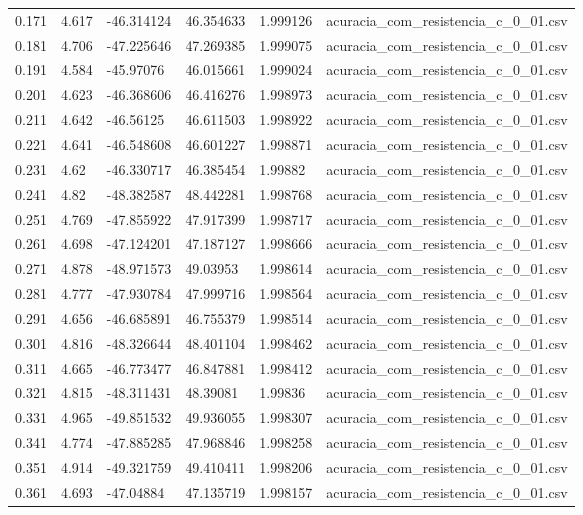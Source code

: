 \begin{table}
\begin{tabular}{llllll}
0.171 & 4.617 & -46.314124 & 46.354633 & 1.999126 & acuracia\_com\_resistencia\_c\_0\_01.csv \\
0.181 & 4.706 & -47.225646 & 47.269385 & 1.999075 & acuracia\_com\_resistencia\_c\_0\_01.csv \\
0.191 & 4.584 & -45.97076 & 46.015661 & 1.999024 & acuracia\_com\_resistencia\_c\_0\_01.csv \\
0.201 & 4.623 & -46.368606 & 46.416276 & 1.998973 & acuracia\_com\_resistencia\_c\_0\_01.csv \\
0.211 & 4.642 & -46.56125 & 46.611503 & 1.998922 & acuracia\_com\_resistencia\_c\_0\_01.csv \\
0.221 & 4.641 & -46.548608 & 46.601227 & 1.998871 & acuracia\_com\_resistencia\_c\_0\_01.csv \\
0.231 & 4.62 & -46.330717 & 46.385454 & 1.99882 & acuracia\_com\_resistencia\_c\_0\_01.csv \\
0.241 & 4.82 & -48.382587 & 48.442281 & 1.998768 & acuracia\_com\_resistencia\_c\_0\_01.csv \\
0.251 & 4.769 & -47.855922 & 47.917399 & 1.998717 & acuracia\_com\_resistencia\_c\_0\_01.csv \\
0.261 & 4.698 & -47.124201 & 47.187127 & 1.998666 & acuracia\_com\_resistencia\_c\_0\_01.csv \\
0.271 & 4.878 & -48.971573 & 49.03953 & 1.998614 & acuracia\_com\_resistencia\_c\_0\_01.csv \\
0.281 & 4.777 & -47.930784 & 47.999716 & 1.998564 & acuracia\_com\_resistencia\_c\_0\_01.csv \\
0.291 & 4.656 & -46.685891 & 46.755379 & 1.998514 & acuracia\_com\_resistencia\_c\_0\_01.csv \\
0.301 & 4.816 & -48.326644 & 48.401104 & 1.998462 & acuracia\_com\_resistencia\_c\_0\_01.csv \\
0.311 & 4.665 & -46.773477 & 46.847881 & 1.998412 & acuracia\_com\_resistencia\_c\_0\_01.csv \\
0.321 & 4.815 & -48.311431 & 48.39081 & 1.99836 & acuracia\_com\_resistencia\_c\_0\_01.csv \\
0.331 & 4.965 & -49.851532 & 49.936055 & 1.998307 & acuracia\_com\_resistencia\_c\_0\_01.csv \\
0.341 & 4.774 & -47.885285 & 47.968846 & 1.998258 & acuracia\_com\_resistencia\_c\_0\_01.csv \\
0.351 & 4.914 & -49.321759 & 49.410411 & 1.998206 & acuracia\_com\_resistencia\_c\_0\_01.csv \\
0.361 & 4.693 & -47.04884 & 47.135719 & 1.998157 & acuracia\_com\_resistencia\_c\_0\_01.csv \\

\end{tabular}
\end{table}
